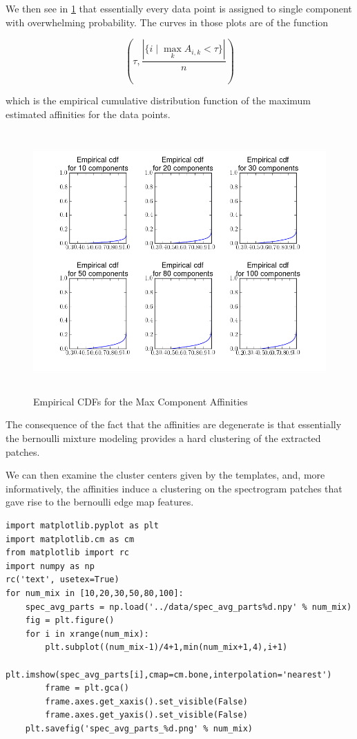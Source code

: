 \documentclass[11pt]{article}
\begin{document}
We then see in \ref{fig:mixture_affinities_cdfs} that essentially
every data point is assigned to single component with overwhelming
probability.  The curves in those plots are of the function

$$ \left( \tau,
          \frac{|\{i\mid \max_k A_{i,k} < \tau \}|}{n}\right)$$ 

which is the empirical cumulative distribution function of the maximum
estimated affinities for the data points.


\begin{figure}[htb]
\centering
\includegraphics[height=10cm]{./mixture_affinities_cdfs.png}
\caption{\label{fig:mixture_affinities_cdfs}Empirical CDFs for the Max Component Affinities}
\end{figure}

The consequence of the fact that the affinities are degenerate is that
essentially the bernoulli mixture modeling provides a hard clustering
of the extracted patches.

We can then examine the cluster centers given by the templates, and,
more informatively, the affinities induce a clustering on the spectrogram
patches that gave rise to the bernoulli edge map features.  


\begin{verbatim}
import matplotlib.pyplot as plt
import matplotlib.cm as cm
from matplotlib import rc
import numpy as np
rc('text', usetex=True)
for num_mix in [10,20,30,50,80,100]:
    spec_avg_parts = np.load('../data/spec_avg_parts%d.npy' % num_mix)
    fig = plt.figure()
    for i in xrange(num_mix):
        plt.subplot((num_mix-1)/4+1,min(num_mix+1,4),i+1)
        plt.imshow(spec_avg_parts[i],cmap=cm.bone,interpolation='nearest')
        frame = plt.gca()
        frame.axes.get_xaxis().set_visible(False)
        frame.axes.get_yaxis().set_visible(False)
    plt.savefig('spec_avg_parts_%d.png' % num_mix)
\end{verbatim}
\end{document}
